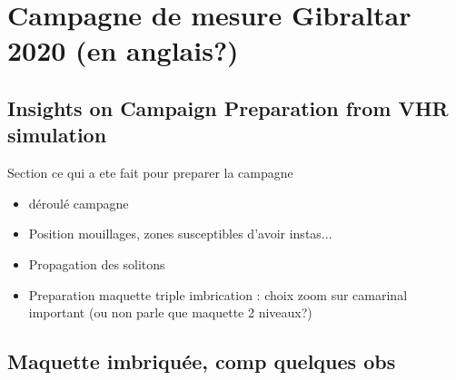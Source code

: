 \section{Campagne de mesure Gibraltar 2020 (en anglais?)}
\subsection{Insights on Campaign Preparation from VHR simulation}
Section ce qui a ete fait pour preparer la campagne

\begin{itemize}
\item déroulé campagne
\item Position mouillages, zones susceptibles d'avoir instas...
\item Propagation des solitons
\item Preparation maquette triple imbrication : choix zoom sur camarinal important (ou non parle que maquette 2 niveaux?)
\end{itemize}


\subsection{Maquette imbriquée, comp quelques obs}




